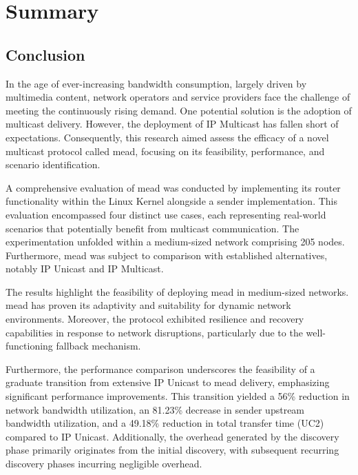 

\chapter{Summary} %
\label{chap:Summary}

\section{Conclusion} %
\label{sec:Conclusion}
In the age of ever-increasing bandwidth consumption, largely driven by
    multimedia content, network operators and service providers face the
    challenge of meeting the continuously rising demand.
One potential solution is the adoption of multicast delivery.
However, the deployment of IP Multicast has fallen short of expectations.
Consequently, this research aimed assess the efficacy of a novel multicast
    protocol called \gls{mead}, focusing on its feasibility, performance, and
    scenario identification.

A comprehensive evaluation of \gls{mead} was conducted by implementing its
    router functionality within the Linux Kernel alongside a sender
    implementation.
This evaluation encompassed four distinct use cases, each representing
    real-world scenarios that potentially benefit from multicast communication.
The experimentation unfolded within a medium-sized network comprising 205
    nodes.
Furthermore, \gls{mead} was subject to comparison with established
    alternatives, notably IP Unicast and IP Multicast.

The results highlight the feasibility of deploying \gls{mead} in medium-sized
    networks.
\gls{mead} has proven its adaptivity and suitability for dynamic network
    environments.
Moreover, the protocol exhibited resilience and recovery capabilities in
    response to network disruptions, particularly due to the well-functioning
    fallback mechanism.

Furthermore, the performance comparison underscores the feasibility of a
    graduate transition from extensive IP Unicast to \gls{mead} delivery,
    emphasizing significant performance improvements.
This transition yielded a 56\% reduction in network bandwidth utilization,
    an 81.23\% decrease in sender upstream bandwidth utilization, and a 49.18\%
    reduction in total transfer time (UC2) compared to IP Unicast.
Additionally, the overhead generated by the discovery phase primarily
    originates from the initial discovery, with subsequent recurring discovery
    phases incurring negligible overhead.

